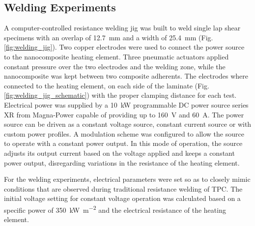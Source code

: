 \documentclass[11pt,review,times]{elsarticle}
\begin{document}
\subsection{Welding Experiments}

A computer-controlled resistance welding jig was built to weld single lap shear specimens with an overlap of \SI{12.7}{\milli\metre} and a width of \SI{25.4}{\milli\metre} (Fig. \ref{fig:welding_jig}). 
Two copper electrodes were used to connect the power source to the nanocomposite heating element. 
Three pneumatic actuators applied constant pressure over the two electrodes and the welding zone, while the nanocomposite was kept between two composite adherents. 
The electrodes where connected to the heating element, on each side of the laminate (Fig. \ref{fig:welding_jig_schematic}) with the proper clamping distance for each test. 
Electrical power was supplied by a \SI{10}{\kW} programmable DC power source series XR from Magna-Power capable of providing up to \SI{160}{\volt} and \SI{60}{\ampere}. 
The power source can be driven as a constant voltage source, constant current source or with custom power profiles. 
A modulation scheme was configured to allow the source to operate with a constant power output. 
In this mode of operation, the source adjusts its output current based on the voltage applied and keeps a constant power output, disregarding variations in the resistance of the heating element. 

For the welding experiments, electrical parameters were set so as to closely mimic conditions that are observed during traditional resistance welding of TPC. 
The initial voltage setting for constant voltage operation was calculated based on a specific power of \SI{350}{\kW\per\square\metre} and the electrical resistance of the heating element. 
\end{document}
